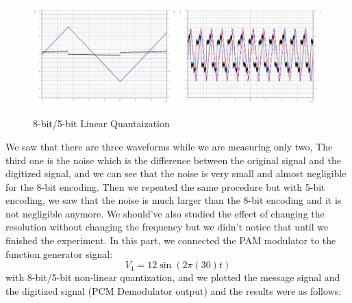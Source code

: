 \documentclass[12pt]{article}
\begin{document}
\begin{figure}[H]
    \centering
    \includegraphics[width=0.49\textwidth]{assets/main/2023-08-26-22-30-20.png}
    \includegraphics[width=0.49\textwidth]{assets/main/2023-08-26-22-36-58.png}
    \caption{8-bit/5-bit Linear Quantaization}
    \label{fig:3}
\end{figure}
We saw that there are three waveforms while we are measuring only two, The third one is the noise which is the difference between the original signal and the digitized signal, and we can see that the noise is very small and almost negligible for the 8-bit encoding. Then we repeated the same procedure but with 5-bit encoding, we saw that the noise is much larger than the 8-bit encoding and it is not negligible anymore. We should've also studied the effect of changing the resolution without changing the frequency but we didn't notice that until we finished the experiment.
In this part, we connected the PAM modulator to the function generator signal:
\begin{equation}
    V_{1} = 12 \sin(2\pi (30) t)
\end{equation}
with 8-bit/5-bit non-linear quantization, and we plotted the message signal and the digitized signal (PCM Demodulator output) and the results were as follows:
\end{document}
